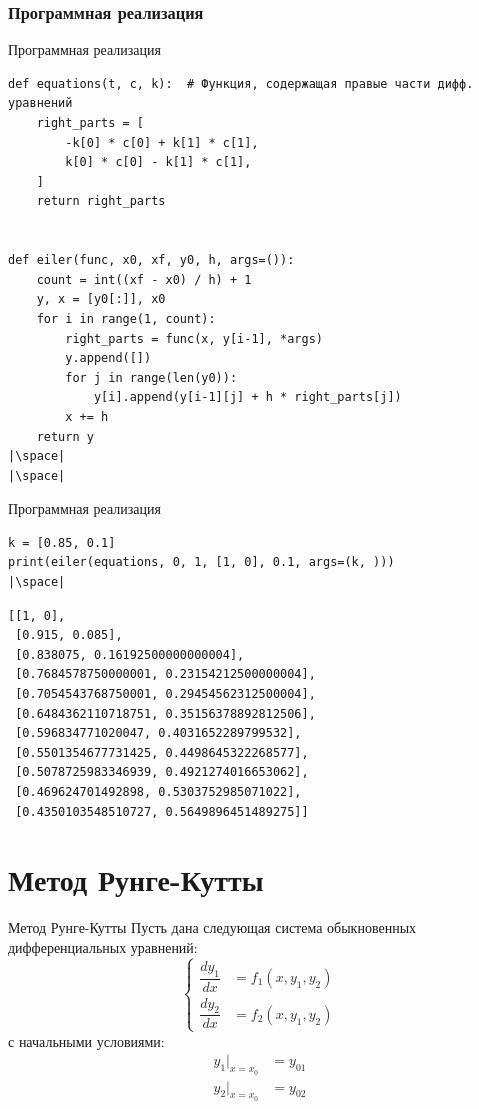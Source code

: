 \documentclass[aspectratio=169, mathserif]{beamer}	%
\begin{document}
\subsubsection{Программная реализация}
\begin{frame}[fragile]{Программная реализация}
\scriptsize
\begin{verbatim}
def equations(t, c, k):  # Функция, содержащая правые части дифф. уравнений
    right_parts = [
        -k[0] * c[0] + k[1] * c[1],
        k[0] * c[0] - k[1] * c[1],
    ]
    return right_parts


def eiler(func, x0, xf, y0, h, args=()):
    count = int((xf - x0) / h) + 1
    y, x = [y0[:]], x0
    for i in range(1, count):
        right_parts = func(x, y[i-1], *args)
        y.append([])
        for j in range(len(y0)):
            y[i].append(y[i-1][j] + h * right_parts[j])
        x += h
    return y
|\space|
|\space|
\end{verbatim}
\vfill
\end{frame}


\begin{frame}[fragile, label=c]{Программная реализация}
\scriptsize
\begin{verbatim}
k = [0.85, 0.1]
print(eiler(equations, 0, 1, [1, 0], 0.1, args=(k, )))
|\space|
\end{verbatim}
\vfill
\begin{verbatim}
[[1, 0],
 [0.915, 0.085],
 [0.838075, 0.16192500000000004],
 [0.7684578750000001, 0.23154212500000004],
 [0.7054543768750001, 0.29454562312500004],
 [0.6484362110718751, 0.35156378892812506],
 [0.596834771020047, 0.4031652289799532],
 [0.5501354677731425, 0.4498645322268577],
 [0.5078725983346939, 0.4921274016653062],
 [0.469624701492898, 0.5303752985071022],
 [0.4350103548510727, 0.5649896451489275]]
\end{verbatim}
\vfill
\end{frame}


\section{Метод Рунге-Кутты}
\sectionframe


\begin{frame}[fragile, label=c]{Метод Рунге-Кутты}
\scriptsize
Пусть дана следующая система обыкновенных дифференциальных уравнений:
\vfill
\begin{equation}
	\left\{
	\begin{aligned}
		\dfrac{dy_1}{dx} &= f_1 \left(x, y_1, y_2\right) \\
		\dfrac{dy_2}{dx} &= f_2\left(x, y_1, y_2\right)
	\end{aligned}
	\right.
\end{equation}
\vfill
\noindent с начальными условиями:
\vfill
\begin{equation}
	\begin{aligned}
		y_1 \big |_{x=x_0} &= y_{01} \\
		y_2 \big |_{x=x_0} &= y_{02}
	\end{aligned}
\end{equation}
\vfill
\end{frame}
\end{document}
